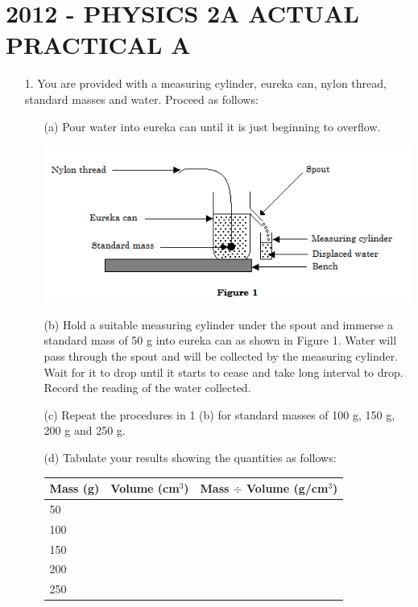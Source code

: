 \section{2012 - PHYSICS 2A ACTUAL PRACTICAL A}

\begin{enumerate}
\item[1.] You are provided with a measuring cylinder, eureka can, nylon thread, standard masses and water. Proceed as follows:
\begin{enumerate}
\item[(a)] Pour water into eureka can until it is just beginning to overflow.

\begin{center}
\includegraphics[width=13cm]{./img/2012-1-alt.png}
\end{center}

\item[(b)] Hold a suitable measuring cylinder under the spout and immerse a standard mass of 50 g into eureka can as shown in Figure 1. Water will pass through the spout and will be collected by the measuring cylinder. Wait for it to drop until it starts to cease and take long interval to drop. Record the reading of the water collected.
\item[(c)] Repeat the procedures in 1 (b) for standard masses of 100 g, 150 g, 200 g and 250 g.
\item[(d)] Tabulate your results showing the quantities as follows:\\

\begin{tabular}{|p{4cm}|p{4cm}|p{4cm}|}\hline
Mass (g) & Volume (cm$^3$) & Mass $\div$ Volume (g/cm$^3$) \\ \hline
50 & & \\ \hline
100 & & \\ \hline
150 & & \\ \hline
200 & & \\ \hline
250 & & \\ \hline
\end{tabular}\\[10pt]


\end{enumerate}
\end{enumerate}
